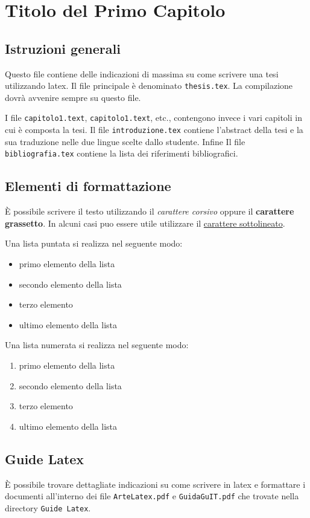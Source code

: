 \chapter{Titolo del Primo Capitolo}
\vspace{4cm}

\section{Istruzioni generali}
Questo file contiene delle indicazioni di massima su come scrivere una tesi utilizzando latex.
Il file principale \`e denominato \texttt{thesis.tex}. La compilazione dovr\`a avvenire sempre su questo file.

I file \texttt{capitolo1.text}, \texttt{capitolo1.text}, etc., contengono invece i vari capitoli in cui \`e composta la tesi.
Il file \texttt{introduzione.tex} contiene l'abstract della tesi e la sua traduzione nelle due lingue scelte dallo studente. Infine Il file \texttt{bibliografia.tex} contiene la lista dei riferimenti bibliografici.

\section{Elementi di formattazione}
\`E possibile scrivere il testo utilizzando il \emph{carattere corsivo} oppure il \textbf{carattere grassetto}.
In alcuni casi puo essere utile utilizzare il \underline{carattere sottolineato}.

Una lista puntata si realizza nel seguente modo:
\begin{itemize}
	\item primo elemento della lista
	\item secondo elemento della lista
	\item terzo elemento
	\item ultimo elemento della lista
\end{itemize}

Una lista numerata si realizza nel seguente modo:
\begin{enumerate}
	\item primo elemento della lista
	\item secondo elemento della lista
	\item terzo elemento
	\item ultimo elemento della lista
\end{enumerate}

\section{Guide Latex}
\`E possibile trovare dettagliate indicazioni su come scrivere in latex e formattare i documenti all'interno dei file \texttt{ArteLatex.pdf} e \texttt{GuidaGuIT.pdf} che trovate nella directory \texttt{Guide Latex}.




